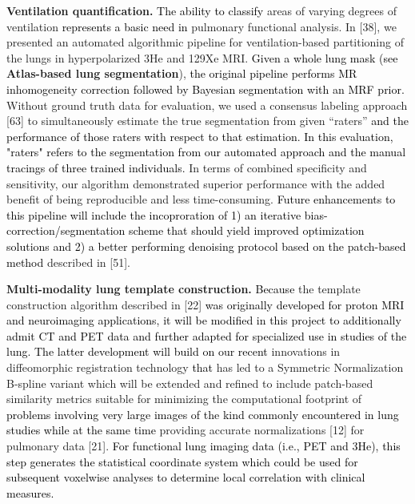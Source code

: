 \documentclass[11pt,]{article}
\begin{document}
\textbf{Ventilation quantification.}
\textcolor{black}{The ability to classify} areas of varying degrees of
ventilation \textcolor{black}{represents a basic need in} pulmonary
functional analysis. In {[}38{]}, we presented an automated algorithmic
pipeline for ventilation-based partitioning of the lungs in
hyperpolarized 3He and 129Xe MRI.
\textcolor{black}{Given a whole lung mask (see } \textbf{Atlas-based
lung segmentation}),
\textcolor{black}{the original pipeline performs MR inhomogeneity correction followed by
Bayesian segmentation with an MRF prior.} Without ground truth data for
evaluation, we used a consensus labeling approach {[}63{]} to
simultaneously estimate the true segmentation from given ``raters''
\textcolor{black}{and the performance of those raters with respect to that estimation.
In this evaluation, "raters" refers to the segmentation from our automated approach
and the manual tracings of three trained individuals.} In terms of
combined specificity and sensitivity, our algorithm demonstrated
superior performance with the added benefit of being reproducible and
less time-consuming.
\textcolor{black}{Future enhancements to this pipeline will include the incoproration
of 1) an iterative bias-correction/segmentation scheme that should yield improved
optimization solutions and 2) a better performing denoising protocol based on the patch-based
method} described in {[}51{]}.

\textbf{Multi-modality lung template construction.}
\textcolor{black}{Because} the template construction algorithm described
in {[}22{]} \textcolor{black}{was
originally developed for proton MRI and neuroimaging applications, it will be
modified in this project to additionally admit CT and PET data and further
adapted for specialized use in studies of the lung.
The latter development will build on our recent} innovations in
diffeomorphic registration technology \textcolor{black}{that} has led to
a Symmetric Normalization B-spline variant which will be extended and
refined to include patch-based similarity metrics suitable for
minimizing the computational footprint of
\textcolor{black}{problems involving very large images of the kind commonly
encountered in lung studies while at the same time} providing accurate
normalizations {[}12{]} for pulmonary data {[}21{]}.
\textcolor{black}{For functional lung imaging data (i.e., PET and 3He), this
step generates the statistical coordinate system which could be used for subsequent
voxelwise analyses to determine local correlation with clinical measures.}
\end{document}
